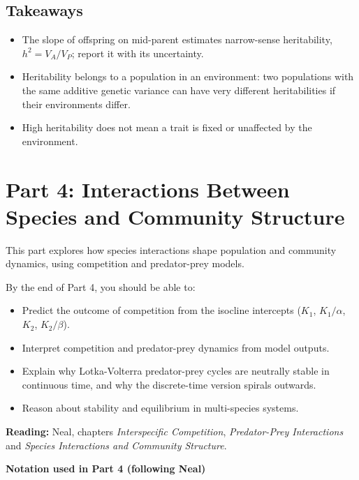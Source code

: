 \documentclass[
  a4paper]{book}
\providecommand{\tightlist}{%
  \setlength{\itemsep}{0pt}\setlength{\parskip}{0pt}}
\begin{document}
\section{Takeaways}\label{takeaways-18}

\begin{itemize}
\tightlist
\item
  The slope of offspring on mid-parent estimates narrow-sense heritability, \(h^2 = V_A/V_P\); report it with its uncertainty.
\item
  Heritability belongs to a population in an environment: two populations with the same additive genetic variance can have very different heritabilities if their environments differ.
\item
  High heritability does not mean a trait is fixed or unaffected by the environment.
\end{itemize}

\chapter*{Part 4: Interactions Between Species and Community Structure}\label{part-4}

This part explores how species interactions shape population and community dynamics, using competition and predator-prey models.

By the end of Part 4, you should be able to:

\begin{itemize}
\tightlist
\item
  Predict the outcome of competition from the isocline intercepts (\(K_1\), \(K_1/\alpha\), \(K_2\), \(K_2/\beta\)).
\item
  Interpret competition and predator-prey dynamics from model outputs.
\item
  Explain why Lotka-Volterra predator-prey cycles are neutrally stable in continuous time, and why the discrete-time version spirals outwards.
\item
  Reason about stability and equilibrium in multi-species systems.
\end{itemize}

\textbf{Reading:} Neal, chapters \emph{Interspecific Competition}, \emph{Predator-Prey Interactions} and \emph{Species Interactions and Community Structure}.

\textbf{Notation used in Part 4 (following Neal)}
\end{document}
